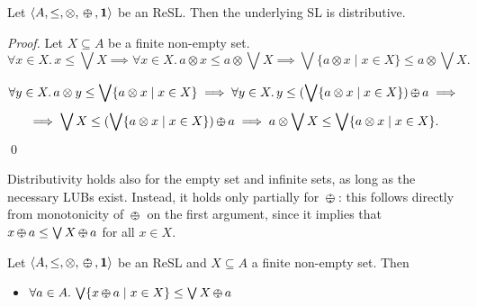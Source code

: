 \documentclass{llncs}
\def\monid{{\mathbf 0}}
\def\monop{\otimes}
\def\odiv{\, {\ominus\hspace{-7.7pt} \div} \,}
\def\monid{\mathbf{1}}
\begin{document}
\begin{lemma}
	\label{dist}
	Let $\langle A, \leq, \monop, \odiv, \monid \rangle$ be an ReSL.
	Then the underlying SL is distributive.
\end{lemma}

\begin{proof} Let $X \subseteq A$ be a finite non-empty set. 	
	\[\forall x \in X.\, x \leq \bigvee X %
	\implies \forall x \in X.\, a \monop x \leq a \monop \bigvee X \implies \bigvee \{a \monop x \mid x \in X\} \leq a \monop  \bigvee X .\]

	\[\forall y \in X.\, a \monop y \leq \bigvee \{a \monop x \mid x \in X\} \implies 
	\forall y \in X.\, y \leq (\bigvee \{a \monop x \mid x \in X\}) \odiv a \implies\] 
	\[ \implies \bigvee X \leq (\bigvee \{a \monop x \mid x \in X\}) \odiv a \implies 
	a \monop \bigvee X \leq \bigvee \{a \monop x \mid x \in X\} .\] 
\qed
\end{proof}

%
Distributivity holds also for the empty set and infinite sets, as long as the necessary LUBs exist.
%
Instead, it holds only partially for $\odiv$: this follows directly from monotonicity of $\odiv$ on the first argument, 
since it implies that $x \odiv a \leq \bigvee X \odiv a$ for all $x \in X$.

\begin{lemma}
	\label{distodiv}
	Let $\langle A, \leq, \monop, \odiv, \monid \rangle$ be an ReSL and $X \subseteq A$ a finite non-empty set. Then 
	\begin{itemize}
		\item $\forall a \in A.\, \bigvee \{ x \odiv a \mid x \in X \} \leq \bigvee X \odiv a$
	\end{itemize}	
\end{lemma}
\end{document}
